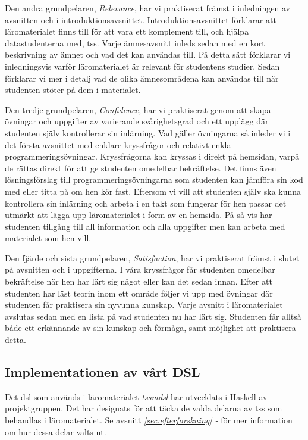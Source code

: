 \documentclass[12pt,a4paper,twoside,openright]{article}
\begin{document}
Den andra grundpelaren, \textit{Relevance}, har vi praktiserat främst
i inledningen av avsnitten och i
introduktionsavsnittet. Introduktionsavsnittet förklarar att
läromaterialet finns till för att vara ett komplement till, och hjälpa
datastudenterna med, \gls{tss}. Varje ämnesavsnitt inleds sedan med
en kort beskrivning av ämnet och vad det kan användas till. På detta
sätt förklarar vi inledningsvis varför läromaterialet är relevant för
studentens studier. Sedan förklarar vi mer i detalj vad de olika
ämnesområdena kan användas till när studenten stöter på dem i
materialet.

Den tredje grundpelaren, \textit{Confidence}, har vi praktiserat genom
att skapa övningar och uppgifter av varierande svårighetsgrad och ett
upplägg där studenten själv kontrollerar sin inlärning. Vad gäller
övningarna så inleder vi i det första avsnittet med enklare
kryssfrågor och relativt enkla programmeringsövningar. Kryssfrågorna
kan kryssas i direkt på hemsidan, varpå de rättas direkt för att ge
studenten omedelbar bekräftelse. Det finns även lösningsförslag till
programmeringsövningarna som studenten kan jämföra sin kod med eller
titta på om hen kör fast. Eftersom vi vill att studenten själv ska
kunna kontrollera sin inlärning och arbeta i en takt som fungerar för
hen passar det utmärkt att lägga upp läromaterialet i form av en
hemsida. På så vis har studenten tillgång till all information och
alla uppgifter men kan arbeta med materialet som hen vill.

Den fjärde och sista grundpelaren, \textit{Satisfaction}, har vi
praktiserat främst i slutet på avsnitten och i uppgifterna. I våra
kryssfrågor får studenten omedelbar bekräftelse när hen har lärt sig
något eller kan det sedan innan. Efter att studenten har läst teorin
inom ett område följer vi upp med övningar där studenten får
praktisera sin nyvunna kunskap. Varje avsnitt i läromaterialet
avslutas sedan med en lista på vad studenten nu har lärt
sig. Studenten får alltså både ett erkännande av sin kunskap och
förmåga, samt möjlighet att praktisera detta.

\subsection{Implementationen av vårt DSL}
\label{sec:implDSL}
Det \gls{dsl} som används i läromaterialet \textit{\gls{tssmdsl}} har
utvecklats i Haskell av projektgruppen. Det har designats för att
täcka de valda delarna av \gls{tss} som behandlas i läromaterialet. Se
avsnitt \textit{\ref{sec:efterforskning} -
  } för mer information om hur dessa delar
valts ut.
\end{document}
